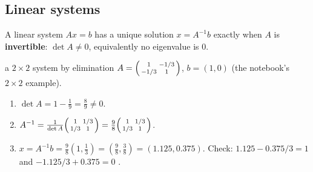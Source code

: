 \documentclass[11pt,a4paper,openany]{book}
\newcounter{wex}[chapter]
\newenvironment{steps}{\begin{enumerate}[label=\textbf{Step \arabic*.}, leftmargin=4.2em, itemsep=2pt]}{\end{enumerate}}
\begin{document}
\subsection{Linear systems}
A linear system $Ax = b$ has a unique solution $x = A^{-1}b$ exactly when $A$ is \textbf{invertible}: $\det A \ne 0$, equivalently no eigenvalue is $0$.
\begin{wexample}{a $2\times2$ system by elimination}
$A = \begin{psmallmatrix}1&-1/3\\-1/3&1\end{psmallmatrix}$, $b = (1, 0)$ (the notebook's $2\times2$ example).
\begin{steps}
\item $\det A = 1 - \frac19 = \frac89 \ne 0$.
\item $A^{-1} = \frac{1}{\det A}\begin{psmallmatrix}1&1/3\\1/3&1\end{psmallmatrix} = \frac98\begin{psmallmatrix}1&1/3\\1/3&1\end{psmallmatrix}$.
\item $x = A^{-1}b = \frac98(1, \tfrac13) = (\tfrac98, \tfrac38) = (1.125, 0.375)$. Check: $1.125 - 0.375/3 = 1$ and $-1.125/3 + 0.375 = 0$ \checkmark.
\end{steps}
\end{wexample}
\end{document}

